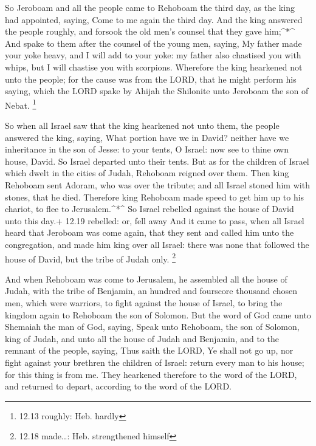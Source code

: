  So Jeroboam and all the people came to Rehoboam the third
day, as the king had appointed, saying, Come to me again the third day.
 And the king answered the people roughly, and forsook the
old men's counsel that they gave him;\^{}*\^{}  And spake
to them after the counsel of the young men, saying, My father made your
yoke heavy, and I will add to your yoke: my father also chastised you
with whips, but I will chastise you with scorpions. 
Wherefore the king hearkened not unto the people; for the cause was from
the LORD, that he might perform his saying, which the LORD spake by
Ahijah the Shilonite unto Jeroboam the son of Nebat. \footnote{12.13
  roughly: Heb. hardly}

 So when all Israel saw that the king hearkened not unto
them, the people answered the king, saying, What portion have we in
David? neither have we inheritance in the son of Jesse: to your tents, O
Israel: now see to thine own house, David. So Israel departed unto their
tents.  But as for the children of Israel which dwelt in
the cities of Judah, Rehoboam reigned over them.  Then king
Rehoboam sent Adoram, who was over the tribute; and all Israel stoned
him with stones, that he died. Therefore king Rehoboam made speed to get
him up to his chariot, to flee to Jerusalem.\^{}*\^{}  So
Israel rebelled against the house of David unto this day.+ 12.19
rebelled: or, fell away  And it came to pass, when all
Israel heard that Jeroboam was come again, that they sent and called him
unto the congregation, and made him king over all Israel: there was none
that followed the house of David, but the tribe of Judah only.
\footnote{12.18 made\ldots: Heb. strengthened himself}

 And when Rehoboam was come to Jerusalem, he assembled all
the house of Judah, with the tribe of Benjamin, an hundred and fourscore
thousand chosen men, which were warriors, to fight against the house of
Israel, to bring the kingdom again to Rehoboam the son of Solomon.
 But the word of God came unto Shemaiah the man of God,
saying,  Speak unto Rehoboam, the son of Solomon, king of
Judah, and unto all the house of Judah and Benjamin, and to the remnant
of the people, saying,  Thus saith the LORD, Ye shall not
go up, nor fight against your brethren the children of Israel: return
every man to his house; for this thing is from me. They hearkened
therefore to the word of the LORD, and returned to depart, according to
the word of the LORD.

